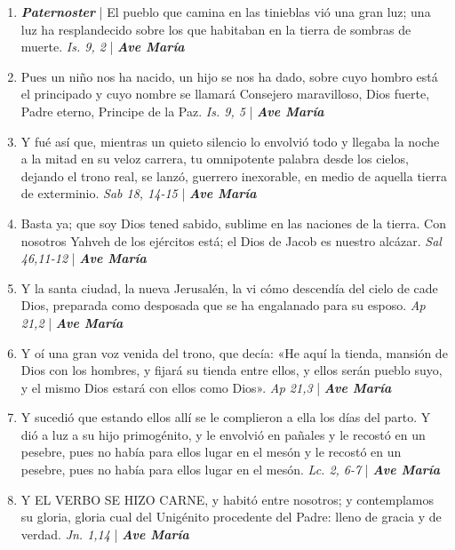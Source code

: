 \documentclass[../../devocionario.tex]{subfiles}
\begin{document}
    \begin{enumerate}
        \item \textbf{\textit{Paternoster}} | El pueblo que camina en las tinieblas vió una gran luz; 
            una luz ha resplandecido sobre los que habitaban en la tierra de sombras de muerte. \textit{Is. 9, 2} | \textbf{\textit{Ave María}}

        \item Pues un niño nos ha nacido, un hijo se nos ha dado, sobre cuyo hombro está el principado y cuyo nombre 
            se llamará Consejero maravilloso, Dios fuerte, Padre eterno, Principe de la Paz. \textit{Is. 9, 5} | \textbf{\textit{Ave María}}

        \item Y fué así que, mientras un quieto silencio lo envolvió todo y llegaba la noche a la mitad en su veloz carrera, 
            tu omnipotente palabra desde los cielos, dejando el trono real, se lanzó, guerrero inexorable, 
            en medio de aquella tierra de exterminio. \textit{Sab 18, 14-15} | \textbf{\textit{Ave María}}

        \item Basta ya; que soy Dios tened sabido, sublime en las naciones de la tierra. Con nosotros Yahveh de los ejércitos está; 
            el Dios de Jacob es nuestro alcázar. \textit{Sal 46,11-12} | \textbf{\textit{Ave María}}

        \item Y la santa ciudad, la nueva Jerusalén, la vi cómo descendía del cielo de cade Dios, 
            preparada como desposada que se ha engalanado para su esposo. \textit{Ap 21,2} | \textbf{\textit{Ave María}}

        \item Y oí una gran voz venida del trono, que decía: «He aquí la tienda, mansión de Dios con los hombres, 
            y fijará su tienda entre ellos, y ellos serán pueblo suyo, y el mismo Dios estará con ellos como Dios». \textit{Ap 21,3} | \textbf{\textit{Ave María}}

        \item Y sucedió que estando ellos allí se le complieron a ella los días del parto. Y dió a luz a su hijo primogénito, 
            y le envolvió en pañales y le recostó en un pesebre, pues no había para ellos lugar en el mesón y le recostó en un pesebre, 
            pues no había para ellos lugar en el mesón. \textit{Lc. 2, 6-7} | \textbf{\textit{Ave María}}

        \item Y EL VERBO SE HIZO CARNE, y habitó entre nosotros; y contemplamos su gloria, gloria cual del Unigénito procedente del Padre: 
            lleno de gracia y de verdad. \textit{Jn. 1,14} | \textbf{\textit{Ave María}}


\end{enumerate}
\end{document}
